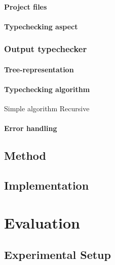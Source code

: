 \documentclass[nofilelist]{cslthse-msc}
\begin{document}
\subsubsection{Project files}
\subsubsection{Typechecking aspect}

\subsection{Output typechecker}
\subsubsection{Tree-representation}
\subsubsection{Typechecking algorithm}
Simple algorithm
Recursive
\subsubsection{Error handling}


\section{Method} %
\section{Implementation} %

\chapter{Evaluation} %
\section{Experimental Setup} %
\end{document}
